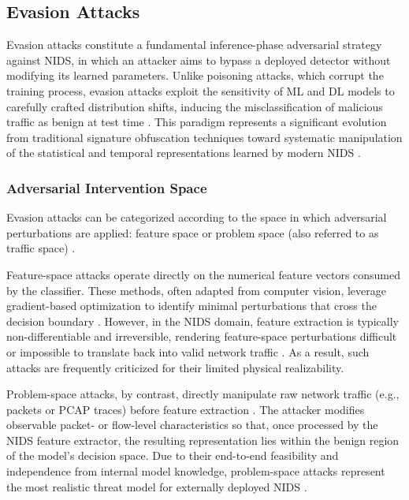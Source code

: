 \subsection{Evasion Attacks}

Evasion attacks constitute a fundamental inference-phase adversarial strategy against NIDS, in which an attacker aims to bypass a deployed detector without modifying its learned parameters. Unlike poisoning attacks, which corrupt the training process, evasion attacks exploit the sensitivity of ML and DL models to carefully crafted distribution shifts, inducing the misclassification of malicious traffic as benign at test time \cite{huang2011adversarial, ahmed2025network}. This paradigm represents a significant evolution from traditional signature obfuscation techniques toward systematic manipulation of the statistical and temporal representations learned by modern NIDS \cite{abomakhelb2025comprehensive}.

\subsubsection{Adversarial Intervention Space}

Evasion attacks can be categorized according to the space in which adversarial perturbations are applied: feature space or problem space (also referred to as traffic space) \cite{ibitoye2025threat}. 

Feature-space attacks operate directly on the numerical feature vectors consumed by the classifier. 
These methods, often adapted from computer vision, leverage gradient-based optimization to identify minimal perturbations that cross the decision boundary \cite{merzouk2022investigating, zhang2022adversarial}. 
However, in the NIDS domain, feature extraction is typically non-differentiable and irreversible, rendering feature-space perturbations difficult or impossible to translate back into valid network traffic \cite{he2023adversarial}. 
As a result, such attacks are frequently criticized for their limited physical realizability.

Problem-space attacks, by contrast, directly manipulate raw network traffic (e.g., packets or PCAP traces) before feature extraction \cite{vitorino2023sok}. 
The attacker modifies observable packet- or flow-level characteristics so that, once processed by the NIDS feature extractor, the resulting representation lies within the benign region of the model’s decision space. 
Due to their end-to-end feasibility and independence from internal model knowledge, problem-space attacks represent the most realistic threat model for externally deployed NIDS \cite{han2021evaluating}.

